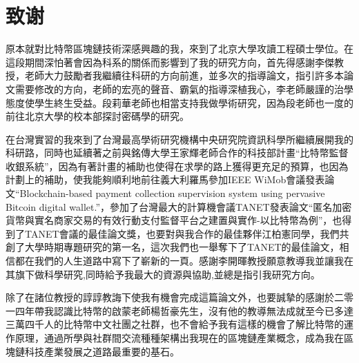 
\chapter{致谢}
原本就對比特幣區塊鏈技術深感興趣的我，來到了北京大學攻讀工程碩士學位。在這段期間深怕著會因為科系的關係而影響到了我的研究方向，首先得感謝李傑教授，老師大力鼓勵者我繼續往科研的方向前進，並多次的指導論文，指引許多本論文需要修改的方向，老師的宏亮的聲音、霸氣的指導深植我心，李老師嚴謹的治學態度使學生終生受益。段莉華老師也相當支持我做學術研究，因為段老師也一度的前往北京大學的校本部探討密碼學的研究。

在台灣實習的我來到了台灣最高學術研究機構中央研究院資訊科學所繼續展開我的科研路，同時也延續著之前與銘傳大學王家輝老師合作的科技部計畫“比特幣監督收銀系統”，因為有著計畫的補助也使得在求學的路上獲得更充足的預算，也因為計劃上的補助，使我能夠順利地前往義大利羅馬參加IEEE WiMob會議發表論文“Blockchain-based payment collection supervision system using pervasive Bitcoin digital wallet.”\supercite{Blockchain-basedpaymentcollectionsupervisionsystemusingpervasiveBitcoindigitalwallet}，參加了台灣最大的計算機會議TANET發表論文“匿名加密貨幣與實名商家交易的有效行動支付監督平台之建置與實作-以比特幣為例”，也得到了TANET會議的最佳論文獎，也要對與我合作的最佳夥伴江柏憲同學，我們共創了大學時期專題研究的第一名，這次我們也一舉奪下了TANET的最佳論文，相信都在我們的人生道路中寫下了嶄新的一頁。感謝李開暉教授願意教導我並讓我在其旗下做科學研究,同時給予我最大的資源與協助,並總是指引我研究方向。

除了在諸位教授的諄諄教誨下使我有機會完成這篇論⽂外，也要誠摯的感謝於⼆零⼀四年帶我認識⽐特幣的啟蒙⽼師楊哲豪先⽣，沒有他的教導無法成就至今已多達三萬四千⼈的⽐特幣中⽂社團之社群，也不會給予我有這樣的機會了解⽐特幣的運作原理，通過所學與社群間交流種種架構出我現在的區塊鏈產業概念，成為我在區塊鏈科技產業發展之道路最重要的基⽯。